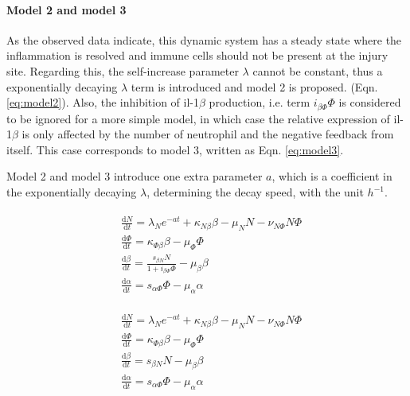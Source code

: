 \documentclass[12pt,a4paper]{report}
\begin{document}
\paragraph{Model 2 and model 3}

As the observed data indicate, this dynamic system has a steady state where the  inflammation is resolved and immune cells should not be present at the injury site. Regarding this, the self-increase parameter $\lambda$ cannot be constant, thus a exponentially decaying $\lambda$ term is introduced and model 2 is proposed. (Eqn. \ref{eq:model2}). Also, the inhibition of il-1$\beta$ production, i.e. term $i_{\beta\Phi}\Phi$ is considered to be ignored for a more simple model, in which case the relative expression of il-1$\beta$ is only affected by the number of neutrophil and the negative feedback from itself. This case corresponds to model 3, written as Eqn. \ref{eq:model3}.

Model 2 and model 3 introduce one extra parameter $a$, which is a coefficient in the exponentially decaying $\lambda$, determining the decay speed, with the unit $h^{-1}$.

\begin{align}
    \label{eq:model2}
    \begin{split}
        &\frac{\mathrm{d} N}{\mathrm{d} t}=\lambda_Ne^{-at}+\kappa_{N\beta}\beta-\mu_NN-\nu_{N\Phi}N\Phi\\
        &\frac{\mathrm{d} \Phi}{\mathrm{d} t}=\kappa_{\Phi\beta}\beta-\mu_\Phi\Phi\\
        &\frac{\mathrm{d} \beta}{\mathrm{d} t}=\frac{s_{\beta N}N}{1+i_{\beta\Phi}\Phi}-\mu_\beta\beta\\
        &\frac{\mathrm{d} \alpha}{\mathrm{d} t}=s_{\alpha\Phi}\Phi-\mu_\alpha\alpha
    \end{split}
\end{align}

\begin{align}
    \label{eq:model3}
    \begin{split}
        &\frac{\mathrm{d} N}{\mathrm{d} t}=\lambda_Ne^{-at}+\kappa_{N\beta}\beta-\mu_NN-\nu_{N\Phi}N\Phi\\
        &\frac{\mathrm{d} \Phi}{\mathrm{d} t}=\kappa_{\Phi\beta}\beta-\mu_\Phi\Phi\\
        &\frac{\mathrm{d} \beta}{\mathrm{d} t}=s_{\beta N}N-\mu_\beta\beta\\
        &\frac{\mathrm{d} \alpha}{\mathrm{d} t}=s_{\alpha\Phi}\Phi-\mu_\alpha\alpha
    \end{split}
\end{align}
\end{document}

